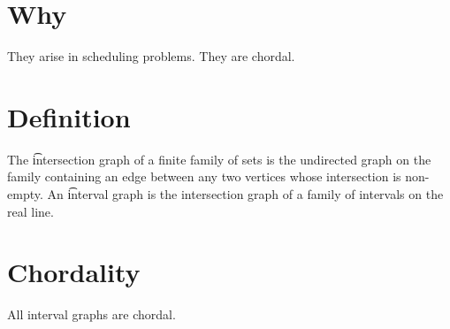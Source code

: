 
\section*{Why}

They arise in scheduling problems.
They are chordal.

\section*{Definition}

The \t{intersection graph} of a finite family of sets is the undirected graph on the family containing an edge between any two vertices whose intersection is non-empty.
An \t{interval graph} is the intersection graph of a family of intervals on the real line.

\section*{Chordality}

\begin{proposition}
All interval graphs are chordal.

\end{proposition}
